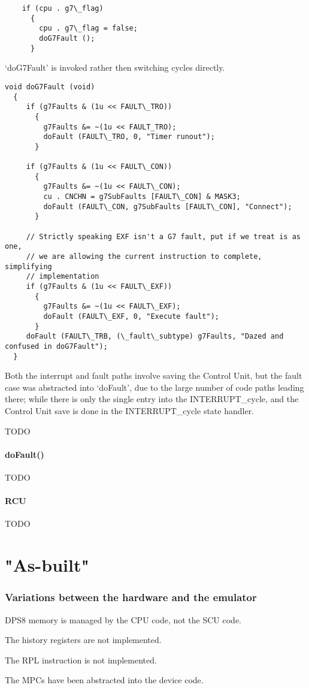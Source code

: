 \documentclass[notitlepage]{report}
\begin{document}
\begin{verbatim}
    if (cpu . g7\_flag)
      {
        cpu . g7\_flag = false;
        doG7Fault ();
      }
\end{verbatim}

`doG7Fault' is invoked rather then switching 
cycles directly.

\begin{verbatim}
void doG7Fault (void)
  {
     if (g7Faults & (1u << FAULT\_TRO))
       {
         g7Faults &= ~(1u << FAULT_TRO);
         doFault (FAULT\_TRO, 0, "Timer runout");
       }

     if (g7Faults & (1u << FAULT\_CON))
       {
         g7Faults &= ~(1u << FAULT\_CON);
         cu . CNCHN = g7SubFaults [FAULT\_CON] & MASK3;
         doFault (FAULT\_CON, g7SubFaults [FAULT\_CON], "Connect");
       }

     // Strictly speaking EXF isn't a G7 fault, put if we treat is as one,
     // we are allowing the current instruction to complete, simplifying
     // implementation
     if (g7Faults & (1u << FAULT\_EXF))
       {
         g7Faults &= ~(1u << FAULT\_EXF);
         doFault (FAULT\_EXF, 0, "Execute fault");
       }
     doFault (FAULT\_TRB, (\_fault\_subtype) g7Faults, "Dazed and confused in doG7Fault");
  }
\end{verbatim}

Both the interrupt and fault paths involve saving the Control Unit, but the fault case was abstracted into
`doFault', due to the large number of code paths leading there; while there is only the single entry into
the INTERRUPT\_cycle, and the Control Unit save is done in the INTERRUPT\_cycle state handler.

TODO

\subsection{doFault()}

TODO

\subsection{RCU}

TODO

\part{"As-built"}

\section{Variations between the hardware and the emulator}

DPS8 memory is managed by the CPU code, not the SCU code.

The history registers are not implemented.

The RPL instruction is not implemented.

The MPCs have been abstracted into the device code.
\end{document}
